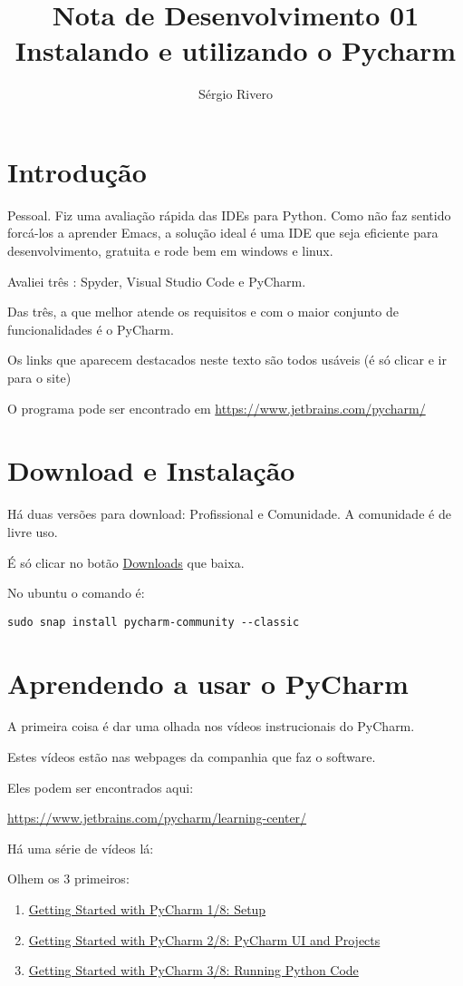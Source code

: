 \documentclass[10pt,a4paper]{article}
\author{Sérgio Rivero}
\title{Nota de Desenvolvimento 01 \\ 
		Instalando e utilizando o Pycharm}
\begin{document}
\maketitle

\section{Introdução}

Pessoal. Fiz uma avaliação rápida das IDEs para Python. Como não faz sentido forcá-los a aprender Emacs, a solução ideal é uma IDE que seja eficiente para desenvolvimento, gratuita e rode bem em windows e linux.

Avaliei três : Spyder, Visual Studio Code e PyCharm.

Das três, a que melhor atende os requisitos e com o maior conjunto de funcionalidades é o PyCharm.

Os links que aparecem destacados neste texto são todos usáveis (é só clicar e ir para o site)

O programa pode ser encontrado em \url{https://www.jetbrains.com/pycharm/}

\section{Download e Instalação}

Há duas versões para download: Profissional e Comunidade. A comunidade é de livre uso.

É só clicar no botão \href{https://www.jetbrains.com/pycharm/download/download-thanks.html?platform=windows&code=PCC}{Downloads} que baixa.

No ubuntu o comando é:

\begin{verbatim}
sudo snap install pycharm-community --classic
\end{verbatim}


\section{Aprendendo a usar o PyCharm}

A primeira coisa é dar uma olhada nos vídeos instrucionais do PyCharm.

Estes vídeos estão nas webpages da companhia que faz o software.

Eles podem ser encontrados aqui:

\url{https://www.jetbrains.com/pycharm/learning-center/}

Há uma série de vídeos lá:

Olhem os 3 primeiros:

\begin{enumerate}
	\item \href{https://www.youtube.com/watch?v=BPC-bGdBSM8}{Getting Started with PyCharm 1/8: Setup}
	
	\item \href{https://www.youtube.com/watch?v=wCJ5kiSmvUY}{Getting Started with PyCharm 2/8: PyCharm UI and Projects}
	
	\item \href{https://www.youtube.com/watch?v=JLfd9LOdu_U}{Getting Started with PyCharm 3/8: Running Python Code}
\end{enumerate}
\end{document}
